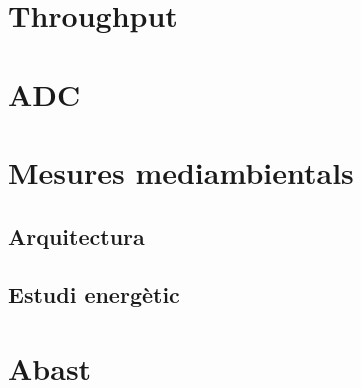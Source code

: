 \section{Throughput}
\section{ADC}


\section{Mesures mediambientals}
\subsection{Arquitectura}
\subsection{Estudi energètic}
\section{Abast}